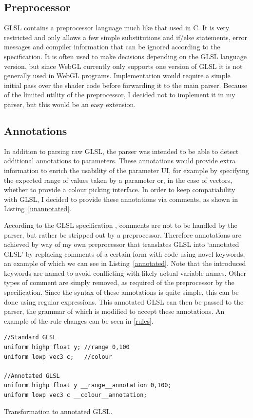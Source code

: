 \documentclass[12pt,twoside,notitlepage]{report}
\begin{document}
\subsection{Preprocessor}
GLSL contains a preprocessor language much like that used in C. It is very restricted and only allows a few simple substitutions and if/else statements, error messages and compiler information that can be ignored according to the specification. It is often used to make decisions depending on the GLSL language version, but since {WebGL} currently only supports one version of GLSL it is not generally used in WebGL programs. Implementation would require a simple initial pass over the shader code before forwarding it to the main parser. Because of the limited utility of the preprocessor, I decided not to implement it in my parser, but this would be an easy extension.

\subsection{Annotations}
\label{annotations}
In addition to parsing raw GLSL, the parser was intended to be able to detect additional annotations to parameters. These annotations would provide extra information to enrich the usability of the parameter UI, for example by specifying the expected range of values taken by a parameter or, in the case of vectors, whether to provide a colour picking interface. In order to keep compatiability with GLSL, I decided to provide these annotations via comments, as shown in Listing~\ref{unannotated}. 

According to the GLSL specification \citet{glsl-spec}, comments are not to be handled by the parser, but rather be stripped out by a preprocessor. Therefore annotations are achieved by way of my own preprocessor that translates GLSL into `annotated GLSL' by replacing comments of a certain form with code using novel keywords, an example of which we can see in Listing~\ref{annotated}. Note that the introduced keywords are named to avoid conflicting with likely actual variable names. Other types of comment are simply removed, as required of the preprocessor by the specification. Since the syntax of these annotations is quite simple, this can be done using regular expressions. This annotated GLSL can then be passed to the parser, the grammar of which is modified to accept these annotations. An example of the rule changes can be seen in \ref{rules}.

\begin{listing}
\begin{verbatim}
//Standard GLSL
uniform highp float y; //range 0,100
uniform lowp vec3 c;   //colour

//Annotated GLSL
uniform highp float y __range__annotation 0,100;
uniform lowp vec3 c __colour__annotation;
\end{verbatim}
\caption{Transformation to annotated GLSL.\label{annotated}}
\end{listing}
\end{document}
